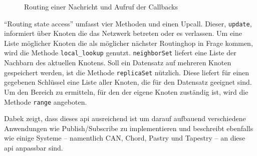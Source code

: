 \begin{figure}[htbp]
\centering
{}
\caption{Routing einer Nachricht und Aufruf der Callbacks}
\label{fig:routing_kbr}
\end{figure}


\enquote{Routing state access} umfasst vier Methoden und einen Upcall. Dieser, \texttt{update}, informiert über Knoten die das Netzwerk betreten oder es verlassen. Um eine Liste möglicher Knoten die als möglicher nächster Routinghop in Frage kommen, wird die Methode \texttt{local\_lookup} genutzt. \texttt{neighborSet} liefert eine Liste der Nachbarn des aktuellen Knotens. Soll ein Datensatz auf mehreren Knoten gespeichert werden, ist die Methode \texttt{replicaSet} nützlich. Diese liefert für einen gegebenen Schlüssel eine Liste aller Knoten, die für den Datensatz geeignet sind. Um den Bereich zu ermitteln, für den der eigene Knoten zuständig ist, wird die Methode \texttt{range} angeboten.

Dabek zeigt, dass dieses \acf{api} ausreichend ist um darauf aufbauend verschiedene Anwendungen wie Publish/Subscribe zu implementieren und beschreibt ebenfalls wie einige Systeme -- namentlich CAN, Chord, Pastry und Tapestry -- an diese \ac{api} anpassbar sind.
